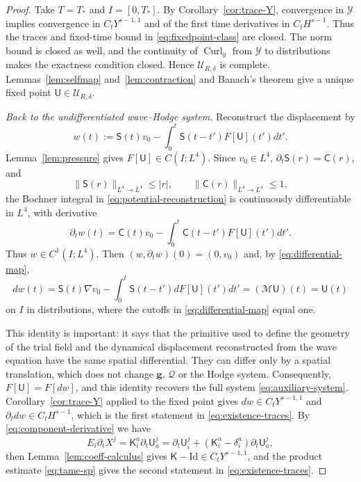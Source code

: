 \documentclass[11pt,reqno]{amsart}
\theoremstyle{plain}
\theoremstyle{definition}
\theoremstyle{remark}
\numberwithin{equation}{section}
\DeclareMathOperator{\Curl}{Curl}
\newcommand{\Ufield}{\mathsf U}
\newcommand{\Kmat}{\mathsf K}
\newcommand{\gmetric}{\mathbf g}
\newcommand{\Cprop}{\mathsf C}
\newcommand{\Sprop}{\mathsf S}
\begin{document}
\begin{proof}
Take $T=T_*$ and $I=[0,T_*]$. By Corollary~\ref{cor:trace-Y}, convergence in
$\mathcal Y$ implies convergence in $C_tY^{s-1,1}$ and of the first time
derivatives in $C_tH^{s-1}$. Thus the traces and fixed-time bound in
\eqref{eq:fixedpoint-class} are closed. The norm bound is closed as well, and
the continuity of $\Curl_y$ from $\mathcal Y$ to distributions makes the
exactness condition closed. Hence $\mathcal U_{R,\delta}$ is complete.
Lemmas~\ref{lem:selfmap} and~\ref{lem:contraction} and Banach's theorem give a
unique fixed point $\Ufield\in\mathcal U_{R,\delta}$.

\textit{Back to the undifferentiated wave--Hodge system.} Reconstruct the displacement by
\begin{equation}\label{eq:potential-reconstruction}
 w(t):=\Sprop(t)v_0-\int_0^t\Sprop(t-t')F[\Ufield](t') dt'.
\end{equation}
Lemma~\ref{lem:pressure} gives $F[\Ufield]\in C(I;L^4)$.  Since
$v_0\in L^4$, $\partial_t\Sprop(r)=\Cprop(r)$, and
\[
 \|\Sprop(r)\|_{L^4\to L^4}\le |r|,
 \qquad
 \|\Cprop(r)\|_{L^4\to L^4}\le 1,
\]
the Bochner integral in \eqref{eq:potential-reconstruction} is continuously
differentiable in $L^4$, with derivative
\[
 \partial_tw(t)=\Cprop(t)v_0
 -\int_0^t\Cprop(t-t')F[\Ufield](t') dt'.
\]
Thus $w\in C^1(I;L^4)$. Then
$(w,\partial_tw)(0)=(0,v_0)$ and, by \eqref{eq:differential-map},
\[
 dw(t)=\Sprop(t)\nabla v_0
       -\int_0^t\Sprop(t-t')dF[\Ufield](t') dt'
       =(\mathcal M\Ufield)(t)=\Ufield(t)
\]
on $I$ in distributions, where the cutoffs in \eqref{eq:differential-map}
equal one.

This identity is important: it says
that the primitive used to define the geometry of the trial field and the
dynamical displacement reconstructed from the wave equation have the same
spatial differential.  They can differ only by a spatial translation, which
does not change $\gmetric$, $\mathcal Q$ or the Hodge system.  Consequently, $F[\Ufield]=F[dw]$, and this identity recovers the full
system \eqref{eq:auxiliary-system}.
Corollary~\ref{cor:trace-Y} applied to the fixed point gives
$dw\in C_tY^{s-1,1}$ and $\partial_tdw\in C_tH^{s-1}$, which is the first
statement in \eqref{eq:existence-traces}.  By \eqref{eq:component-derivative} we have
\[
 E_i\partial_tX^j
 =\Kmat^a_i\partial_t\Ufield_a^j
 =\partial_t\Ufield_i^j
  +(\Kmat^a_i-\delta_i^a)\partial_t\Ufield_a^j,
\]
then Lemma~\ref{lem:coeff-calculus} gives
$\Kmat-\mathrm{Id}\in C_tY^{s-1,1}$, and the product estimate \eqref{eq:tame-sp} gives the
second statement in \eqref{eq:existence-traces}.


\end{proof}
\end{document}
